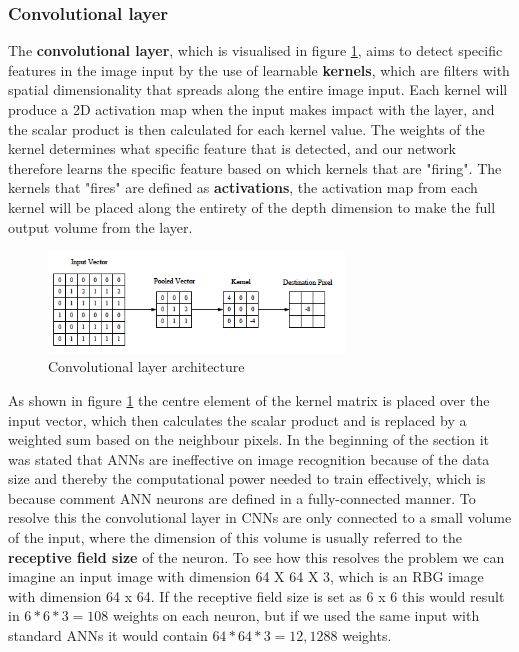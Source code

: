 \subsubsection{Convolutional layer}
The \textbf{convolutional layer}, which is visualised in figure \ref{fig:convolutional}, aims to detect specific features in the image input by the use of learnable \textbf{kernels}, which are filters with spatial dimensionality that spreads along the entire image input. Each kernel will produce a 2D activation map when the input makes impact with the layer, and the scalar product is then calculated for each kernel value. The weights of the kernel determines what specific feature that is detected, and our network therefore learns the specific feature based on which kernels that are "firing". The kernels that "fires" are defined as \textbf{activations}, the activation map from each kernel will be placed along the entirety of the depth dimension to make the full output volume from the layer.
\begin{figure}[H]
    \centering
    \includegraphics[width=0.7\textwidth]{images/chap2/convolutional_layer.png}
    \caption{Convolutional layer architecture \cite{Keiron}}
    \label{fig:convolutional}
\end{figure}
As shown in figure \ref{fig:convolutional} the centre element of the kernel matrix is placed over the input vector, which then calculates the scalar product and is replaced by a weighted sum based on the neighbour pixels. In the beginning of the section it was stated that ANNs are ineffective on image recognition because of the data size and thereby the computational power needed to train effectively, which is because comment ANN neurons are defined in a fully-connected manner. To resolve this the convolutional layer in CNNs are only connected to a small volume of the input, where the dimension of this volume is usually referred to the \textbf{receptive field size} of the neuron. To see how this resolves the problem we can imagine an input image with dimension 64 X 64 X 3, which is an RBG image with dimension 64 x 64. If the receptive field size is set as 6 x 6 this would result in $6*6*3=108$ weights on each neuron, but if we used the same input with standard ANNs it would contain $64*64*3=12,1288$ weights.\\\\
